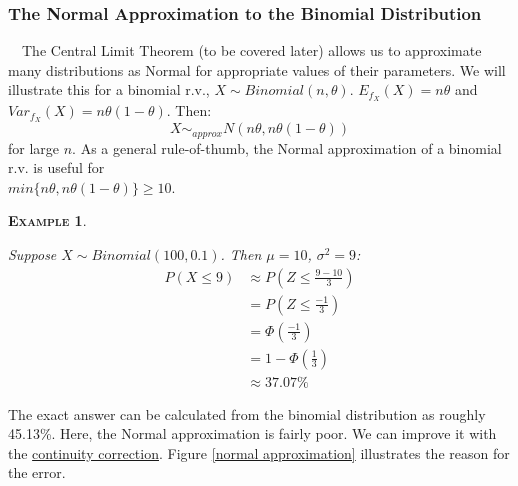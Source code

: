 \documentclass[12pt,a4paper]{article}
\newtheorem{example}{\textsc{Example}}[section]
\begin{document}
\subsubsection{The Normal Approximation to the Binomial Distribution}\label{normal approx to bin}

$\quad$The Central Limit Theorem (to be covered later) allows us to approximate many distributions as Normal for appropriate values of their parameters. We will illustrate this for a binomial r.v., $X \sim Binomial(n,\theta)$. $E_{f_X}(X) = n\theta$ and $Var_{f_X}(X) = n\theta(1-\theta)$. Then:
$$X \sim_{approx} N(n\theta,n\theta(1-\theta))$$
for large $n$. As a general rule-of-thumb, the Normal approximation of a binomial r.v. is useful for\\$min\{n\theta,n\theta(1-\theta)\} \geq 10$.

\begin{example}$\;$\par
\vspace{1cm}

Suppose $X \sim Binomial(100,0.1)$. Then $\mu = 10$, $\sigma^2 = 9$:
\begin{align*}
P(X \leq 9) &\approx P\left(Z \leq \frac{9-10}{3}\right)\\
&=P\left(Z \leq \frac{-1}{3}\right)\\
&= \Phi\left(\frac{-1}{3}\right)\\
&= 1-\Phi\left(\frac{1}{3}\right)\\
&\approx 37.07\%
\end{align*}
\end{example}

The exact answer can be calculated from the binomial distribution as roughly 45.13\%. Here, the Normal approximation is fairly poor. We can improve it with the \underline{continuity correction}. Figure \ref{normal approximation} illustrates the reason for the error.
\end{document}
